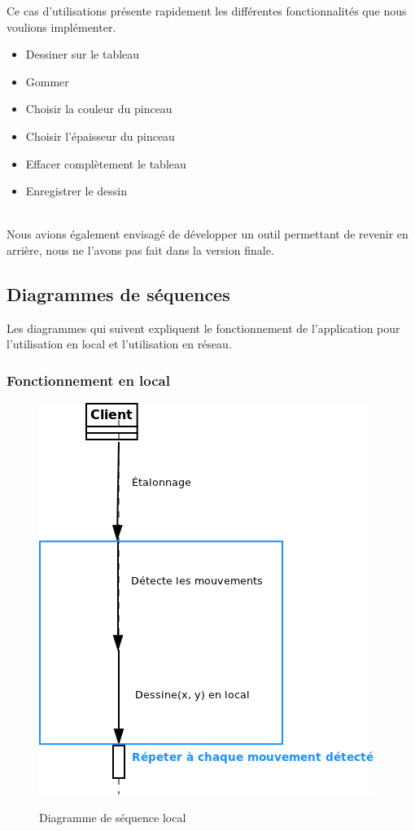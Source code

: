 \documentclass{report}
\begin{document}
				Ce cas d'utilisations présente rapidement les différentes fonctionnalités que nous voulions implémenter.
				\begin{itemize}
				\item Dessiner sur le tableau
				\item Gommer
				\item Choisir la couleur du pinceau
				\item Choisir l'épaisseur du pinceau
				\item Effacer complètement le tableau
				\item Enregistrer le dessin
				\end{itemize}
				\ \\
				Nous avions également envisagé de développer un outil permettant de revenir en arrière, nous ne l'avons pas fait dans la version finale. \\
			\newpage
			\subsection{Diagrammes de séquences}
			Les diagrammes qui suivent expliquent le fonctionnement de l'application pour l'utilisation en local et l'utilisation en réseau.
			\subsubsection{Fonctionnement en local}
				\begin{figure}[!h]
						\centering
						\includegraphics[scale=0.6]{../images/sequence_local.png}\\
						\caption{Diagramme de séquence local}
						\label{Diagramme de séquence local}
				\end{figure}
\end{document}
